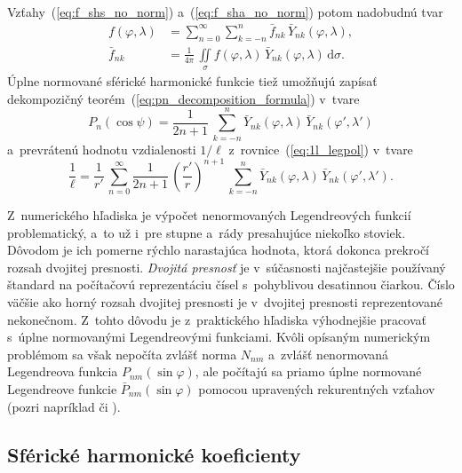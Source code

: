 \documentclass[a4paper, 12pt]{book}
\newcommand{\diff}{\mathrm d}
\begin{document}
Vzťahy~(\ref{eq:f_shs_no_norm}) a~(\ref{eq:f_sha_no_norm}) potom nadobudnú tvar
%
\begin{align}
\label{eq:f_shs}
f(\varphi, \lambda) &= \sum_{n = 0}^\infty \sum_{k = -n}^n \bar{f}_{nk} \,
\bar{Y}_{nk}(\varphi, \lambda){,}\\
%
\label{eq:f_sha}
\bar{f}_{nk} &= \frac{1}{4\pi} \, \iint\limits_{\sigma} f(\varphi, \lambda) \,
\bar{Y}_{nk}(\varphi, \lambda) \, \diff \sigma{.}
\end{align}
%
Úplne normované sférické harmonické funkcie tiež umožňujú zapísať dekompozičný
teorém~(\ref{eq:pn_decomposition_formula}) v~tvare
\parencite{MoritzPhysicalGeodesy}
%
\begin{equation}
P_n(\cos\psi) = \frac{1}{2n + 1} \, \sum_{k = -n}^n \bar{Y}_{nk}(\varphi,
\lambda) \, \bar{Y}_{nk}(\varphi', \lambda')
\end{equation}
%
a~prevrátenú hodnotu vzdialenosti $1 \slash \ell$ 
z~rovnice~(\ref{eq:1l_legpol}) v~tvare
%
\begin{equation}
\label{eq:1l_sh}
\frac{1}{\ell} = \frac{1}{r'} \, \sum_{n = 0}^{\infty} \frac{1}{2n + 1} \, 
\left( \frac{r'}{r} \right)^{n + 1} \, \sum_{k = -n}^n \bar{Y}_{nk}(\varphi,
\lambda) \, \bar{Y}_{nk}(\varphi', \lambda'){.}
\end{equation}

Z~numerického hľadiska je výpočet nenormovaných Legendreových funkcií 
problematický, a~to už i~pre stupne a~rády presahujúce niekoľko stoviek.  
Dôvodom je ich pomerne rýchlo narastajúca hodnota, ktorá dokonca prekročí 
rozsah dvojitej presnosti.  \emph{Dvojitá presnosť} je v~súčasnosti 
najčastejšie používaný štandard na počítačovú reprezentáciu čísel s~pohyblivou 
desatinnou čiarkou.  Číslo väčšie ako horný rozsah dvojitej presnosti je 
v~dvojitej presnosti reprezentované nekonečnom.  Z~tohto dôvodu je 
z~praktického hľadiska výhodnejšie pracovať s~úplne normovanými Legendreovými 
funkciami.  Kvôli opísaným numerickým problémom sa však nepočíta zvlášť norma 
$N_{nm}$ a~zvlášť nenormovaná Legendreova funkcia $P_{nm}(\sin\varphi)$, ale 
počítajú sa priamo úplne normované Legendreove funkcie 
$\bar{P}_{nm}(\sin\varphi)$ pomocou upravených rekurentných vzťahov (pozri 
napríklad \cite{Holmes2002a} či \cite{Fukushima2012a}).



\subsection{Sférické harmonické koeficienty}
\label{sec:shc_norm}
\end{document}
